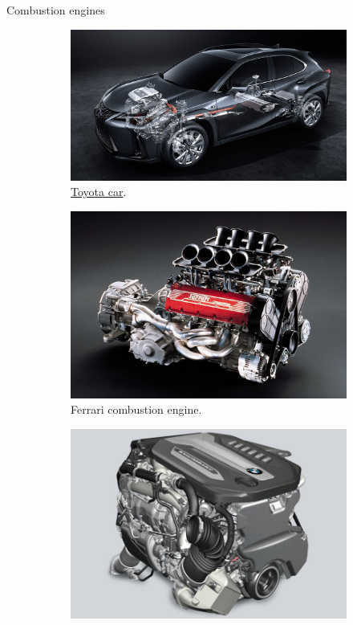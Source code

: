 \documentclass[10pt
hyperref={
    pdfauthor={Hong Quan Ba Nguyen},
    pdftitle={Optimal Shape Design of Air Ducts in Combustion Engines: Design a General Framework},
    pdfsubject={Talk},
    pdfcreator={LaTeX},
}
]{beamer}
\begin{document}
\begin{frame}{Combustion engines}
    \vspace{5mm}   
    \begin{figure}
        \begin{subfigure}{.49\textwidth}
            \centering
            \includegraphics[width=.7\linewidth]{Combustion_Engine_in_Car}  
            \caption{\href{https://lexusenthusiast.com/2018/04/24/internal-combustion-engines-remain-priority-at-toyota/}{Toyota car}.}
            \label{fig:sub-first}
        \end{subfigure}        
        \begin{subfigure}{.49\textwidth}
            \centering
            \includegraphics[width=.7\linewidth]{Ferrari_355_Engine}  
            \caption{Ferrari combustion engine.}
            \label{fig:sub-fourth}
        \end{subfigure}    
        \begin{subfigure}{.49\textwidth}
            \centering
            \includegraphics[width=.7\linewidth]{BMW_Combustion_Engine}  

\end{subfigure}
\end{figure}
\end{frame}
\end{document}
